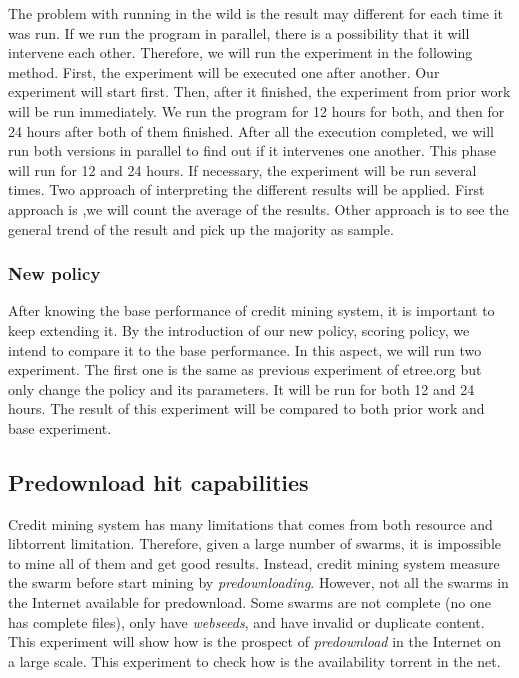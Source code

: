The problem with running in the wild is the result may different for each time it was run. If we run the program in parallel, there is a possibility that it will intervene each other. Therefore, we will run the experiment in the following method. First, the experiment will be executed one after another. Our experiment will start first. Then, after it finished, the experiment from prior work will be run immediately. We run the program for 12 hours for both, and then for 24 hours after both of them finished. After all the execution completed, we will run both versions in parallel to find out if it intervenes one another. This phase will run for 12 and 24 hours. If necessary, the experiment will be run several times. Two approach of interpreting the different results will be applied. First approach is ,we will count the average of the results. Other approach is to see the general trend of the result and pick up the majority as sample. 

\subsubsection{New policy}
After knowing the base performance of credit mining system, it is important to keep extending it. By the introduction of our new policy, scoring policy, we intend to compare it to the base performance. In this aspect, we will run two experiment. The first one is the same as previous experiment of etree.org but only change the policy and its parameters. It will be run for both 12 and 24 hours. The result of this experiment will be compared to both prior work and base experiment. 


\subsection{Predownload hit capabilities}
Credit mining system has many limitations that comes from both resource and libtorrent limitation. Therefore, given a large number of swarms, it is impossible to mine all of them and get good results. Instead, credit mining system measure the swarm before start mining by \textit{predownloading}. However, not all the swarms in the Internet available for predownload. Some swarms are not complete (no one has complete files), only have \textit{webseeds}, and have invalid or duplicate content. This experiment will show how is the prospect of \textit{predownload} in the Internet on a large scale. 
This experiment to check how is the availability torrent in the net.

